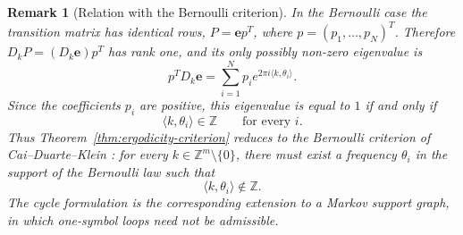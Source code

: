 \documentclass[11pt,a4paper]{amsart}
\newtheorem{remark}[theorem]{Remark}
\begin{document}
\begin{remark}[Relation with the Bernoulli criterion]
In the Bernoulli case the transition matrix has identical rows,
\(P=\mathbf e p^T\), where \(p=(p_1,\ldots,p_N)^T\).  Therefore
\(D_kP=(D_k\mathbf e)p^T\) has rank one, and its only possibly
non-zero eigenvalue is
\[
 p^TD_k\mathbf e
 =
 \sum_{i=1}^N p_i
 e^{2\pi i\langle k,\theta_i\rangle}.
\]
Since the coefficients \(p_i\) are positive, this eigenvalue is equal
to \(1\) if and only if
\[
 \langle k,\theta_i\rangle\in\mathbb Z
 \qquad\text{for every }i.
\]
Thus Theorem~\ref{thm:ergodicity-criterion} reduces to the
Bernoulli criterion of Cai--Duarte--Klein
\cite[Proposition~2.1 and Theorem~2.3]{CDKMixed}: for every
\(k\in\mathbb Z^m\setminus\{0\}\), there must exist a frequency
\(\theta_i\) in the support of the Bernoulli law such that
\[
 \langle k,\theta_i\rangle\notin\mathbb Z.
\]
The cycle formulation is the corresponding extension to a 
Markov support graph, in which one-symbol loops need not be
admissible.
\end{remark}
\end{document}
